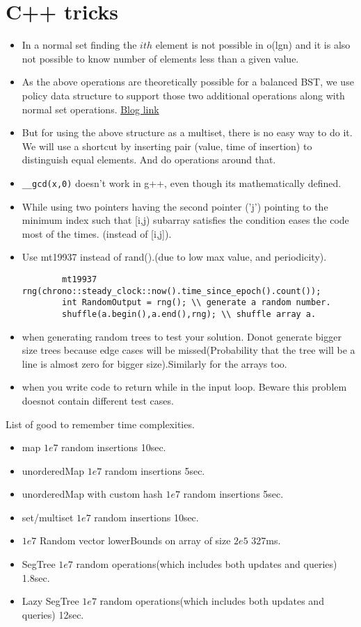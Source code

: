 \documentclass[../Notes.tex]{subfiles}
\begin{document}
\chapter{C++ tricks}

\begin{itemize}
	\item In a normal set finding the $ith$ element is not possible in o(lgn)
	and it is also not possible to know number of elements less than a given value.
	\item As the above operations are theoretically possible for a balanced BST, we use policy data structure to support those two additional operations along with normal set operations. \href{https://codeforces.com/blog/entry/11080}{Blog link}
	\item But for using the above structure as a multiset, there is no easy way to do it. We will use a shortcut by inserting pair (value, time of insertion) to distinguish equal elements. And do operations around that.
	\item \texttt{\_\_gcd(x,0)} doesn't work in g++, even though its mathematically defined.
	\item While using two pointers having the second pointer ('j') pointing to the minimum index such that [i,j) subarray satisfies the condition eases the code most of the times. (instead of [i,j]).
	\item Use mt19937 instead of rand().(due to low max value, and periodicity).
	\begin{lstlisting}
		mt19937 rng(chrono::steady_clock::now().time_since_epoch().count());
		int RandomOutput = rng(); \\ generate a random number.
		shuffle(a.begin(),a.end(),rng); \\ shuffle array a.
	\end{lstlisting}
	\item when generating random trees to test your solution. Donot generate bigger size trees because edge cases will be missed(Probability that the tree will be a line is almost zero for bigger size).Similarly for the arrays too.
	\item when you write code to return while in the input loop. Beware this problem doesnot contain different test cases.
\end{itemize}

List of good to remember time complexities.
\begin{itemize}
	\item map $1e7$ random insertions 10sec.
	\item unorderedMap $1e7$ random insertions 5sec.
	\item unorderedMap with custom hash $1e7$ random insertions 5sec.
	\item set/multiset $1e7$ random insertions 10sec.
	\item $1e7$ Random vector lowerBounds on array of size $2e5$ 327ms.
	\item SegTree $1e7$ random operations(which includes both updates and queries) 1.8sec.
	\item Lazy SegTree $1e7$ random operations(which includes both updates and queries) 12sec.  
\end{itemize}
\end{document}
